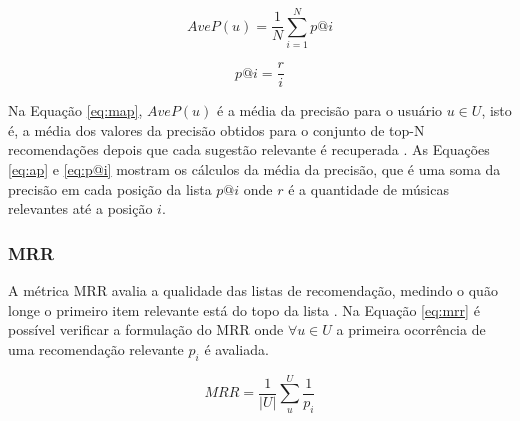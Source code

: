 \begin{equation}
    \label{eq:ap}
    AveP(u) = \frac{1}{N}\sum_{i=1}^{N}p@i
\end{equation}

\begin{equation}
    \label{eq:p@i}
    p@i = \frac{r}{i}
\end{equation}

Na Equação \ref{eq:map}, $AveP(u)$ é a média da precisão para o usuário $u \in U$, isto é, a média dos valores da precisão obtidos para o conjunto de top-N recomendações depois que cada sugestão relevante é recuperada \cite{Manning:2008}. As Equações \ref{eq:ap} e \ref{eq:p@i} mostram os cálculos da média da precisão, que é uma soma da precisão em cada posição da lista $p@i$ onde $r$ é a quantidade de músicas relevantes até a posição $i$.

\subsubsection{MRR}
A métrica \ac{MRR} avalia a qualidade das listas de recomendação, medindo o quão longe o primeiro item relevante está do topo da lista \cite{qin:2013}. Na Equação \ref{eq:mrr} é possível verificar a formulação do \ac{MRR} onde $\forall u \in U$  a primeira ocorrência de uma recomendação relevante $p_{i}$ é avaliada.

\begin{equation}
    MRR = \frac{1}{|U|}\sum_{u}^{U}\frac{1}{p_{i}}
    \label{eq:mrr}
\end{equation}




